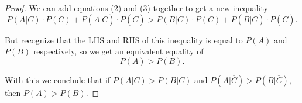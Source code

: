\documentclass{exam}
\begin{document}
\begin{questions}
\begin{proof}
We can add equations (2) and (3) together to get a new inequality
$$P(A | C) \cdot P(C) + P(A | \overline{C}) \cdot P(\overline{C}) > P(B | C) \cdot P(C) + P(B | \overline{C}) \cdot P(\overline{C}).$$

But recognize that the LHS and RHS of this inequality is equal to $P(A)$ and $P(B)$ respectively, so we get an equivalent equality of
$$P(A) > P(B).$$

With this we conclude that if $P(A | C) > P(B | C)$ and $P(A | \overline{C}) > P(B | \overline{C})$, then $P(A) > P(B)$.
\end{proof}
\end{questions}
\end{document}
